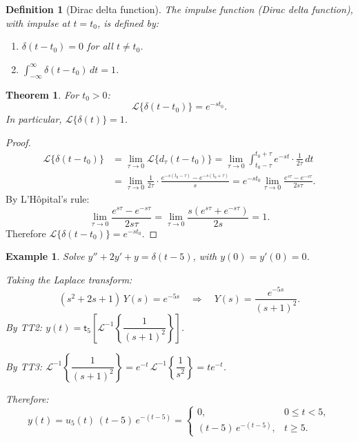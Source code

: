 \documentclass{article}
\newtheorem{theorem}{Theorem}
\newtheorem{definition}{Definition}
\newtheorem*{example}{Example}
\newcommand{\Lap}{\mathcal{L}}
\newcommand{\Linv}{\mathcal{L}^{-1}}
\begin{document}
\begin{definition}[Dirac delta function]
    The impulse function (Dirac delta function), with impulse at $t = t_0$, is defined by:
    \begin{enumerate}[nosep]
        \item $\delta(t-t_0) = 0$ for all $t \neq t_0$.
        \item $\displaystyle\int_{-\infty}^{\infty}\delta(t-t_0)\,dt = 1$.
    \end{enumerate}
\end{definition}

\begin{theorem}
    For $t_0 > 0$:
    \[\Lap\{\delta(t-t_0)\} = e^{-st_0}.\]
    In particular, $\Lap\{\delta(t)\} = 1$.
\end{theorem}

\begin{proof}
    \begin{align*}
        \Lap\{\delta(t-t_0)\}
        &= \lim_{\tau\to 0}\Lap\{d_\tau(t-t_0)\}
        = \lim_{\tau\to 0}\int_{t_0-\tau}^{t_0+\tau}e^{-st}\cdot\frac{1}{2\tau}\,dt\\
        &= \lim_{\tau\to 0}\frac{1}{2\tau}\cdot\frac{e^{-s(t_0-\tau)} - e^{-s(t_0+\tau)}}{s}
        = e^{-st_0}\lim_{\tau\to 0}\frac{e^{s\tau} - e^{-s\tau}}{2s\tau}.
    \end{align*}
    By L'H\^opital's rule:
    \[\lim_{\tau\to 0}\frac{e^{s\tau} - e^{-s\tau}}{2s\tau} = \lim_{\tau\to 0}\frac{s(e^{s\tau} + e^{-s\tau})}{2s} = 1.\]
    Therefore $\Lap\{\delta(t-t_0)\} = e^{-st_0}$.
\end{proof}

\begin{example}
    Solve $y'' + 2y' + y = \delta(t-5)$, with $y(0) = y'(0) = 0$.

    Taking the Laplace transform:
    \[(s^2+2s+1)\,Y(s) = e^{-5s} \quad\Longrightarrow\quad Y(s) = \frac{e^{-5s}}{(s+1)^2}.\]
    By TT2: $y(t) = \mathsf{t}_5\!\left[\Linv\!\left\{\dfrac{1}{(s+1)^2}\right\}\right]$.

    By TT3: $\Linv\!\left\{\dfrac{1}{(s+1)^2}\right\} = e^{-t}\,\Linv\!\left\{\dfrac{1}{s^2}\right\} = te^{-t}$.

    Therefore:
    \[\boxed{y(t) = u_5(t)\,(t-5)\,e^{-(t-5)} = \begin{cases}0, & 0\leq t<5,\\ (t-5)\,e^{-(t-5)}, & t\geq 5.\end{cases}}\]
\end{example}
\end{document}

